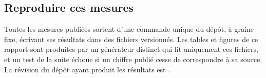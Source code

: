 \subsection{Reproduire ces mesures}

Toutes les mesures publiées sortent d'une commande unique du dépôt, à graine
fixe, écrivant ses résultats dans des fichiers versionnés. Les tables et
figures de ce rapport sont produites par un générateur distinct qui lit
uniquement ces fichiers, et un test de la suite échoue si un chiffre publié
cesse de correspondre à sa source. La révision du dépôt ayant produit les
résultats est \code{\XTenGitHead}.
